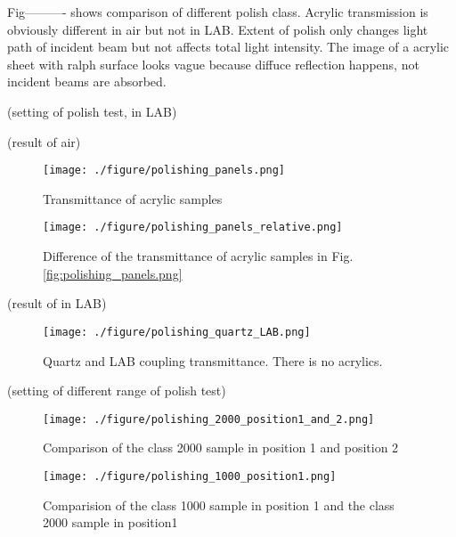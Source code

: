 Fig----------  shows comparison of different
polish class. Acrylic transmission is obviously different in air but not in LAB.
Extent of polish only changes light path of incident beam but not affects total light intensity.
The image of a acrylic sheet with ralph surface looks vague because diffuce reflection happens, not
incident beams are absorbed.



(setting of polish test, in LAB)




(result of air)
\begin{figure}[h]
    \centering
    \texttt{[image: ./figure/polishing\_panels.png]}
    \caption{Transmittance of acrylic samples}
    \label{polishing_panels.png}
    \end{figure}



\begin{figure}[h]
    \centering
    \texttt{[image: ./figure/polishing\_panels\_relative.png]}
    \caption{Difference of the transmittance of acrylic samples in Fig. \ref{fig:polishing_panels.png}}
    \label{polishing_panels_relative.png}
    \end{figure}


(result of in LAB)
\begin{figure}[h]
    \centering
    \texttt{[image: ./figure/polishing\_quartz\_LAB.png]}
    \caption{Quartz and LAB coupling transmittance. There is no acrylics.}
    \label{polishing_quartz_LAB.png}
    \end{figure}



(setting of different range of polish test)
\begin{figure}[h]
    \centering
    \texttt{[image: ./figure/polishing\_2000\_position1\_and\_2.png]}
    \caption{Comparison of the class 2000 sample in position 1 and position 2}
    \label{polishing_2000_position1_and_2.png}
    \end{figure}



\begin{figure}[h]
    \centering
    \texttt{[image: ./figure/polishing\_1000\_position1.png]}
    \caption{Comparision of the class 1000 sample in position 1 and the class 2000 sample in position1}
    \label{polishing_1000_position1.png}
    \end{figure}


